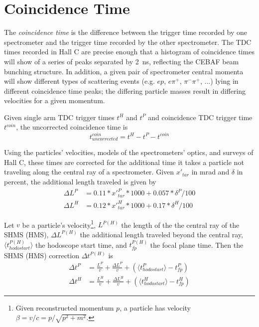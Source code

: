 \section{Coincidence Time}
The \textit{coincidence time} is the difference between the trigger time
recorded by one spectrometer and the trigger time recorded by the other
spectrometer.
The TDC times recorded in Hall C are precise enough that a histogram of
coincidence times will show of a series of peaks separated by
\SI{2}{\nano\second}, reflecting the CEBAF beam bunching structure.
In addition, a given pair of spectrometer central momenta will show different
types of scattering events (e.g. $ep$, $e\pi^+$, $\pi^-\pi^+$, ...) lying in
different coincidence time peaks; the differing particle masses result in
differing velocities for a given momentum.

Given single arm TDC trigger times $t^H$ and $t^P$ and coincidence TDC trigger
time $t^{coin}$, the uncorrected coincidence time is
\begin{equation}
    t^{coin}_{uncorrected} = t^H - t^P - t^{coin}
\end{equation}

Using the particles' velocities, models of the spectrometers' optics, and
surveys of Hall C, these times are corrected for the additional time it takes a
particle not traveling along the central ray of a spectrometer.
Given $x'_{tar}$ in \si{\milli\radian} and $\delta$ in percent, the additional
length traveled is given by
\begin{align}
    \Delta L^P &= 0.11 * x'^{P}_{tar} * 1000 + 0.057 * \delta^{P}/100 \\
    \Delta L^H &= 0.12 * x'^{H}_{tar}* 1000 + 0.17 * \delta^{H}/100
\end{align}

Let $v$ be a particle's velocity\footnote{Given reconstructed momentum $p$, a
 particle has velocity $\beta = v/c = p / \sqrt{p^2+m^2}$.},
$L^{P(H)}$ the length of the the central ray of the SHMS (HMS),
$\Delta L^{P(H)}$ the additional length traveled beyond the central ray,
$\langle t^{P(H)}_{hodostart}\rangle$ the hodoscope start time, and
$t^{P(H)}_{fp}$ the focal plane time.
Then the SHMS (HMS) correction $\Delta t^{P(H)}$ is
\begin{align}
    \Delta t^P &= \frac{L^P}{v} + \frac{\Delta L^P}{v} + \left( \langle t^{P}_{hodostart}\rangle - t^{P}_{fp} \right) \\
    \Delta t^H &= \frac{L^H}{v} + \frac{\Delta L^H}{v} + \left( \langle t^{H}_{hodostart}\rangle - t^{H}_{fp} \right)
\end{align}

